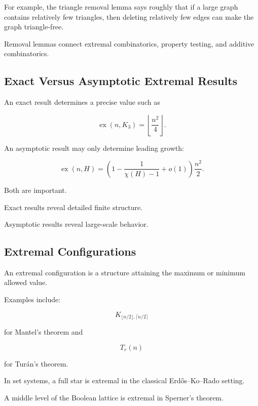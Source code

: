 For example, the triangle removal lemma says roughly that if a large
graph contains relatively few triangles, then deleting relatively few
edges can make the graph triangle-free.

Removal lemmas connect extremal combinatorics, property testing, and
additive combinatorics.

\subsection{Exact Versus Asymptotic Extremal Results}
\label{subsec:exact-asymptotic-extremal}

An exact result determines a precise value such as

\[
\operatorname{ex}(n,K_3)
=
\left\lfloor\frac{n^2}{4}\right\rfloor.
\]

An asymptotic result may only determine leading growth:

\[
\operatorname{ex}(n,H)
=
\left(
1-\frac{1}{\chi(H)-1}+o(1)
\right)
\frac{n^2}{2}.
\]

Both are important.

Exact results reveal detailed finite structure.

Asymptotic results reveal large-scale behavior.

\subsection{Extremal Configurations}
\label{subsec:extremal-configurations}

An extremal configuration is a structure attaining the maximum or
minimum allowed value.

Examples include:

\[
K_{\lfloor n/2\rfloor,\lceil n/2\rceil}
\]

for Mantel's theorem and

\[
T_r(n)
\]

for Tur\'an's theorem.

In set systems, a full star is extremal in the classical
Erd\H{o}s--Ko--Rado setting.

A middle level of the Boolean lattice is extremal in Sperner's theorem.

